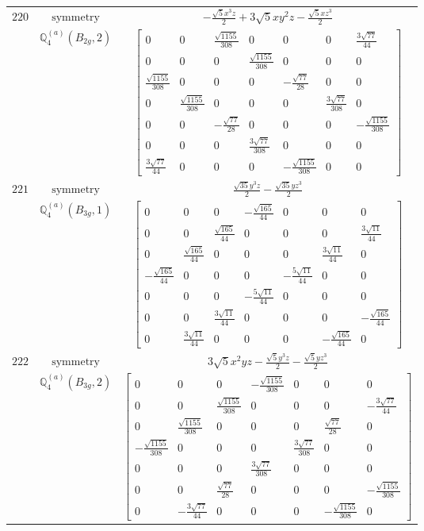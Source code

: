 \documentclass[fleqn,8pt,landscape]{jsarticle}
\begin{document}
\begin{longtable}{ccc}
$ 220 $ & $ \text{symmetry} $ & $ - \frac{\sqrt{5} x^{3} z}{2} + 3 \sqrt{5} x y^{2} z - \frac{\sqrt{5} x z^{3}}{2} $ \\
$  $ & $ \mathbb{Q}_{4}^{(a)}(B_{2g},2) $ & $ \begin{bmatrix} 0 & 0 & \frac{\sqrt{1155}}{308} & 0 & 0 & 0 & \frac{3 \sqrt{77}}{44} \\ 0 & 0 & 0 & \frac{\sqrt{1155}}{308} & 0 & 0 & 0 \\ \frac{\sqrt{1155}}{308} & 0 & 0 & 0 & - \frac{\sqrt{77}}{28} & 0 & 0 \\ 0 & \frac{\sqrt{1155}}{308} & 0 & 0 & 0 & \frac{3 \sqrt{77}}{308} & 0 \\ 0 & 0 & - \frac{\sqrt{77}}{28} & 0 & 0 & 0 & - \frac{\sqrt{1155}}{308} \\ 0 & 0 & 0 & \frac{3 \sqrt{77}}{308} & 0 & 0 & 0 \\ \frac{3 \sqrt{77}}{44} & 0 & 0 & 0 & - \frac{\sqrt{1155}}{308} & 0 & 0 \end{bmatrix} $ \\ \hline
$ 221 $ & $ \text{symmetry} $ & $ \frac{\sqrt{35} y^{3} z}{2} - \frac{\sqrt{35} y z^{3}}{2} $ \\
$  $ & $ \mathbb{Q}_{4}^{(a)}(B_{3g},1) $ & $ \begin{bmatrix} 0 & 0 & 0 & - \frac{\sqrt{165}}{44} & 0 & 0 & 0 \\ 0 & 0 & \frac{\sqrt{165}}{44} & 0 & 0 & 0 & \frac{3 \sqrt{11}}{44} \\ 0 & \frac{\sqrt{165}}{44} & 0 & 0 & 0 & \frac{3 \sqrt{11}}{44} & 0 \\ - \frac{\sqrt{165}}{44} & 0 & 0 & 0 & - \frac{5 \sqrt{11}}{44} & 0 & 0 \\ 0 & 0 & 0 & - \frac{5 \sqrt{11}}{44} & 0 & 0 & 0 \\ 0 & 0 & \frac{3 \sqrt{11}}{44} & 0 & 0 & 0 & - \frac{\sqrt{165}}{44} \\ 0 & \frac{3 \sqrt{11}}{44} & 0 & 0 & 0 & - \frac{\sqrt{165}}{44} & 0 \end{bmatrix} $ \\ \hline
$ 222 $ & $ \text{symmetry} $ & $ 3 \sqrt{5} x^{2} y z - \frac{\sqrt{5} y^{3} z}{2} - \frac{\sqrt{5} y z^{3}}{2} $ \\
$  $ & $ \mathbb{Q}_{4}^{(a)}(B_{3g},2) $ & $ \begin{bmatrix} 0 & 0 & 0 & - \frac{\sqrt{1155}}{308} & 0 & 0 & 0 \\ 0 & 0 & \frac{\sqrt{1155}}{308} & 0 & 0 & 0 & - \frac{3 \sqrt{77}}{44} \\ 0 & \frac{\sqrt{1155}}{308} & 0 & 0 & 0 & \frac{\sqrt{77}}{28} & 0 \\ - \frac{\sqrt{1155}}{308} & 0 & 0 & 0 & \frac{3 \sqrt{77}}{308} & 0 & 0 \\ 0 & 0 & 0 & \frac{3 \sqrt{77}}{308} & 0 & 0 & 0 \\ 0 & 0 & \frac{\sqrt{77}}{28} & 0 & 0 & 0 & - \frac{\sqrt{1155}}{308} \\ 0 & - \frac{3 \sqrt{77}}{44} & 0 & 0 & 0 & - \frac{\sqrt{1155}}{308} & 0 \end{bmatrix} $ \\ \hline

\end{longtable}
\end{document}
